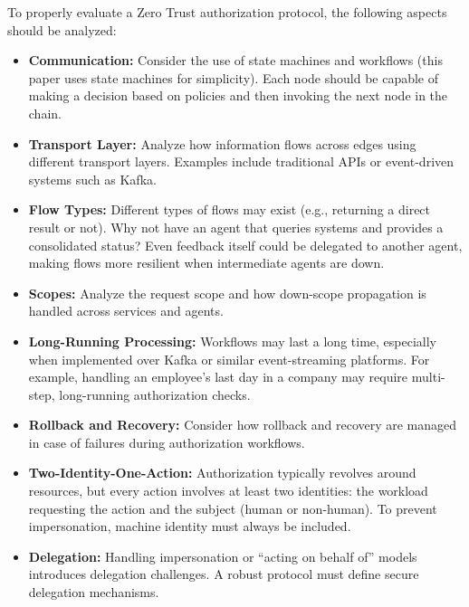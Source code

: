 To properly evaluate a Zero Trust authorization protocol, the following aspects should be analyzed:

\begin{itemize}
    \item \textbf{Communication:}  
    Consider the use of state machines and workflows (this paper uses state machines for simplicity).  
    Each node should be capable of making a decision based on policies and then invoking the next node in the chain.  

    \item \textbf{Transport Layer:}  
    Analyze how information flows across edges using different transport layers.  
    Examples include traditional APIs or event-driven systems such as Kafka.  

    \item \textbf{Flow Types:}  
    Different types of flows may exist (e.g., returning a direct result or not).  
    Why not have an agent that queries systems and provides a consolidated status?  
    Even feedback itself could be delegated to another agent, making flows more resilient when intermediate agents are down.  

    \item \textbf{Scopes:}  
    Analyze the request scope and how down-scope propagation is handled across services and agents.  

    \item \textbf{Long-Running Processing:}  
    Workflows may last a long time, especially when implemented over Kafka or similar event-streaming platforms.  
    For example, handling an employee’s last day in a company may require multi-step, long-running authorization checks.  

    \item \textbf{Rollback and Recovery:}  
    Consider how rollback and recovery are managed in case of failures during authorization workflows.  

    \item \textbf{Two-Identity-One-Action:}  
    Authorization typically revolves around resources, but every action involves at least two identities:  
    the workload requesting the action and the subject (human or non-human).  
    To prevent impersonation, machine identity must always be included.  

    \item \textbf{Delegation:}  
    Handling impersonation or “acting on behalf of” models introduces delegation challenges.  
    A robust protocol must define secure delegation mechanisms.  


\end{itemize}
